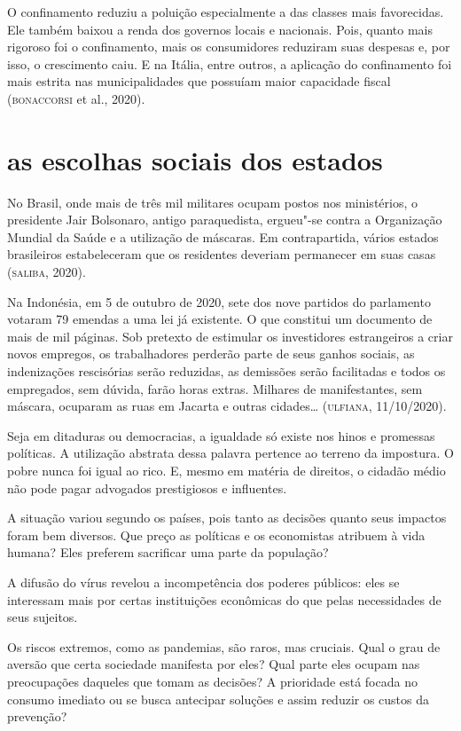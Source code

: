 O confinamento reduziu a poluição especialmente a das classes mais
favorecidas. Ele também baixou a renda dos governos locais e nacionais.
Pois, quanto mais rigoroso foi o confinamento, mais os consumidores
reduziram suas despesas e, por isso, o crescimento caiu. E na Itália,
entre outros, a aplicação do confinamento foi mais estrita nas
municipalidades que possuíam maior capacidade fiscal (\textsc{bonaccorsi} et al.,
2020).

\section{as escolhas sociais dos estados}

No Brasil, onde mais de três mil militares ocupam postos nos
ministérios, o presidente Jair Bolsonaro, antigo paraquedista, ergueu"-se
contra a Organização Mundial da Saúde e a utilização de máscaras. Em
contrapartida, vários estados brasileiros estabeleceram que os
residentes deveriam permanecer em suas casas (\textsc{saliba}, 2020).

Na Indonésia, em 5 de outubro de 2020, sete dos nove partidos do
parlamento votaram 79 emendas a uma lei já existente. O que constitui um
documento de mais de mil páginas. Sob pretexto de estimular os
investidores estrangeiros a criar novos empregos, os trabalhadores
perderão parte de seus ganhos sociais, as indenizações rescisórias serão
reduzidas, as demissões serão facilitadas e todos os empregados, sem
dúvida, farão horas extras. Milhares de manifestantes, sem máscara,
ocuparam as ruas em Jacarta e outras cidades\ldots{} (\textsc{ulfiana}, 11/10/2020).

Seja em ditaduras ou democracias, a igualdade só existe nos hinos e
promessas políticas. A utilização abstrata dessa palavra pertence ao
terreno da impostura. O pobre nunca foi igual ao rico. E, mesmo em
matéria de direitos, o cidadão médio não pode pagar advogados
prestigiosos e influentes.

A situação variou segundo os países, pois tanto as decisões quanto seus
impactos foram bem diversos. Que preço as políticas e os economistas
atribuem à vida humana? Eles preferem sacrificar uma parte da população?

A difusão do vírus revelou a incompetência dos poderes públicos: eles se
interessam mais por certas instituições econômicas do que pelas
necessidades de seus sujeitos.

Os riscos extremos, como as pandemias, são raros, mas cruciais. Qual o
grau de aversão que certa sociedade manifesta por eles? Qual parte eles
ocupam nas preocupações daqueles que tomam as decisões? A prioridade
está focada no consumo imediato ou se busca antecipar soluções e assim
reduzir os custos da prevenção?

